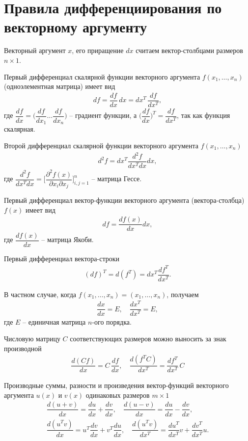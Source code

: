 \documentclass[%
	11pt,
	a4paper,
	utf8,
		]{article}
\begin{document}
\section{Правила дифференциирования по векторному аргументу}

Векторный аргумент $ x $, его приращение $ dx $ считаем вектор-столбцами размеров $ n \times 1 $.

Первый дифференциал скалярной функции векторного аргумента $ f(x_1, \ldots, x_n) $ (одноэлементная матрица) имеет вид
\begin{align*}
	df = \dfrac{df}{dx} \, dx = dx^T \, \dfrac{df}{dx^T},
\end{align*}
где $ \dfrac{df}{dx} = \Big( \dfrac{df}{dx_1} \ldots \dfrac{df}{dx_n} \Big) $ -- градиент функции, а $ \Big( \dfrac{df}{dx} \Big)^T = \dfrac{df}{dx^T} $, так как функция скалярная.

Второй дифференциал скалярной функции векторного аргумента $ f(x_1, \ldots, x_n) $
\begin{align*}
	d^2 f = dx^T \dfrac{d^2 f}{dx^T dx} dx,
\end{align*}
где $ \dfrac{d^2 f}{dx^T dx} = \Bigg[ \dfrac{\partial^2 f(x)}{\partial x_i \partial x_j} \Bigg]_{i,j=1}^{n} $ -- матрица Гессе.

Первый дифференциал вектор-функции векторного аргумента (вектора-столбца) $ f(x) $ имеет вид
\begin{align*}
	df = \dfrac{df(x)}{dx} dx,
\end{align*}
где $ \dfrac{df(x)}{dx} $ -- матрица Якоби.

Первый дифференциал вектора-строки
\begin{align*}
	(df)^T = d(f^T) = dx^T \dfrac{df^T}{dx^T}.
\end{align*}

В частном случае, когда $ f(x_1, \ldots, x_n) = (x_1, \ldots, x_n) $, получаем
\begin{align*}
	\dfrac{dx}{dx} = E, \quad \dfrac{dx^T}{dx^T} = E,
\end{align*}
где $ E $ -- единичная матрица $ n $-ого порядка.

Числовую матрицу $ C $ соответствующих размеров можно выносить за знак производной
\begin{align*}
	\dfrac{d(Cf)}{dx} = C \, \dfrac{df}{dx}, \quad \dfrac{d(f^T C)}{dx^T} = \dfrac{df^T}{dx^T} \, C
\end{align*}

Производные суммы, разности и произведения вектор-функций векторного аргумента $ u(x) $ и $ v(x) $ одинаковых размеров $ m \times 1 $
\begin{align*}
	\dfrac{d(u + v)}{dx} = \dfrac{du}{dx} + \dfrac{dv}{dx}, \quad \dfrac{d(u - v)}{dx} = \dfrac{du}{dx} - \dfrac{dv}{dx}, \\
	\dfrac{d(u^T v)}{dx} = u^T \dfrac{dv}{dx} + v^T \dfrac{du}{dx}, \quad \dfrac{d(u^T v)}{dx^T} = \dfrac{du^T}{dx^T} v + \dfrac{d v^T}{dx^T} u.
\end{align*}
\end{document}
